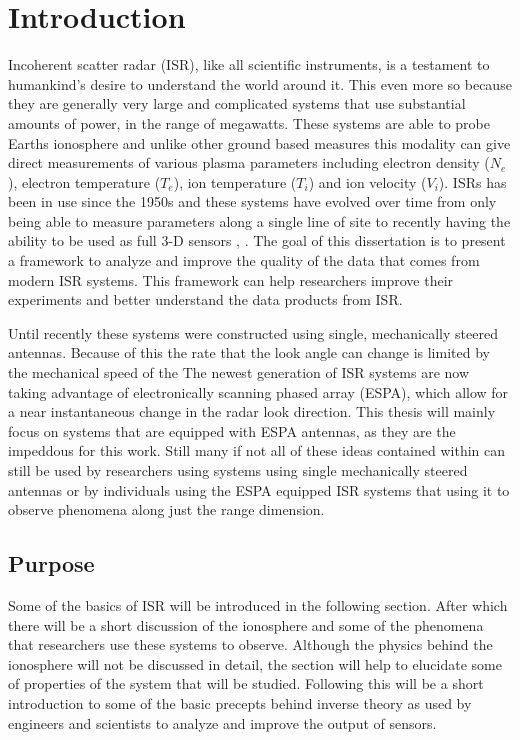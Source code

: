 \chapter{Introduction}
\label{chapter:body}
\thispagestyle{myheadings}
\setcounter{tocdepth}{1}
\graphicspath{{1_Intro/Figures/}}

Incoherent scatter radar (ISR), like all scientific instruments, is a testament to humankind's desire to understand the world around it. This even more so because they are generally very large and complicated systems that use substantial amounts of power, in the range of megawatts. These systems are able to probe Earths ionosphere and unlike other ground based measures this modality can give direct measurements of various plasma parameters including electron density ($N_e$), electron temperature ($T_e$), ion temperature ($T_i$) and ion velocity ($V_i$). ISRs has been in use since the 1950s \cite{gordon58} and these systems have evolved over time from only being able to measure parameters along a single line of site to recently having the ability to be used as full 3-D sensors \cite{Semeter2009738}, \cite{Nicolls:2007ie}. The goal of this dissertation is to present a framework to analyze and improve the quality of the data that comes from modern ISR systems. This framework can help researchers improve their experiments and better understand the data products from ISR.

Until recently these systems were constructed using single, mechanically steered antennas. Because of this the rate that the look angle can change is limited by the mechanical speed of the  The newest generation of ISR systems are now taking advantage of electronically scanning phased array (ESPA), which allow for a near instantaneous change in the radar look direction. This thesis will mainly focus on systems that are equipped with ESPA antennas, as they are the impeddous for this work. Still many if not all of these ideas contained within can still be used by researchers using systems using single mechanically steered antennas or by individuals using the ESPA equipped ISR systems that using it to observe phenomena along just the range dimension.

 
\section{Purpose}
Some of the basics of ISR will be introduced in the following section. After which there will be a short discussion of the ionosphere and some of the phenomena that researchers use these systems to observe. Although the physics behind the ionosphere will not be discussed in detail, the section will help to elucidate some of properties of the system that will be studied. Following this will be a short introduction to some of the basic precepts behind inverse theory as used by engineers and scientists to analyze and improve the output of sensors.

